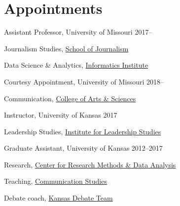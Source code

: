 
\section{Appointments}

Assistant Professor, University of Missouri                    \hfill 2017--

  \begin{outerlist}
    \item[] Journalism Studies, \href{http://journalism.missouri.edu/}{School of Journalism}
    \item[] Data Science \& Analytics, \href{https://muii.missouri.edu/}{Informatics Institute}
  \end{outerlist}\vspace{.2in}

Courtesy Appointment, University of Missouri                   \hfill 2018--

  \begin{outerlist}
    \item[] Communication, \href{https://communication.missouri.edu/}{College of Arts \& Sciences}
  \end{outerlist}\vspace{.2in}


Instructor, University of Kansas                               \hfill 2017

  \begin{outerlist}
    \item[] Leadership Studies, \href{https://ils.ku.edu/about/}{Institute for Leadership Studies}
  \end{outerlist}\vspace{.2in}

Graduate Assistant, University of Kansas                       \hfill 2012--2017

  \begin{outerlist}
    \item[] Research, \href{http://www.crmda.ku.edu/}{Center for Research Methods \& Data Analysis}
    \item[] Teaching, \href{http://www.coms.ku.edu/}{Communication Studies}
    \item[] Debate coach, \href{http://www.debate.ku.edu/}{Kansas Debate Team}
  \end{outerlist}
